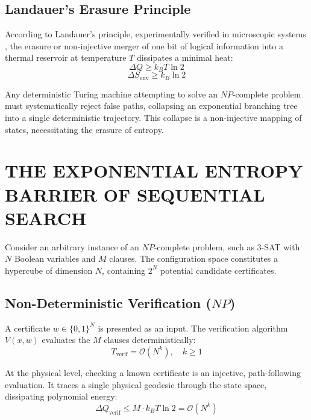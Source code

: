 \documentclass[10pt,twocolumn]{article}
\begin{document}
\subsection{Landauer's Erasure Principle}

According to Landauer's principle, experimentally verified in microscopic systems \cite{Berut2012}, the erasure or non-injective merger of one bit of logical information into a thermal reservoir at temperature $T$ dissipates a minimal heat:
\begin{equation}
  \Delta Q \ge k_B T \ln 2
\end{equation}
\begin{equation}
  \Delta S_{\text{env}} \ge k_B \ln 2
\end{equation}

Any deterministic Turing machine attempting to solve an $NP$-complete problem must systematically reject false paths, collapsing an exponential branching tree into a single deterministic trajectory. This collapse is a non-injective mapping of states, necessitating the erasure of entropy.



\section{THE EXPONENTIAL ENTROPY BARRIER OF SEQUENTIAL SEARCH}

Consider an arbitrary instance of an $NP$-complete problem, such as 3-SAT with $N$ Boolean variables and $M$ clauses. The configuration space constitutes a hypercube of dimension $N$, containing $2^N$ potential candidate certificates.


\subsection{Non-Deterministic Verification ($NP$)}

A certificate $w \in \{0, 1\}^N$ is presented as an input. The verification algorithm $V(x, w)$ evaluates the $M$ clauses deterministically:
\begin{equation}
  T_{\text{verif}} = \mathcal{O}(N^k), \quad k \ge 1
\end{equation}

At the physical level, checking a known certificate is an injective, path-following evaluation. It traces a single physical geodesic through the state space, dissipating polynomial energy:
\begin{equation}
  \Delta Q_{\text{verif}} \le M \cdot k_B T \ln 2 = \mathcal{O}(N^k)
\end{equation}
\end{document}

